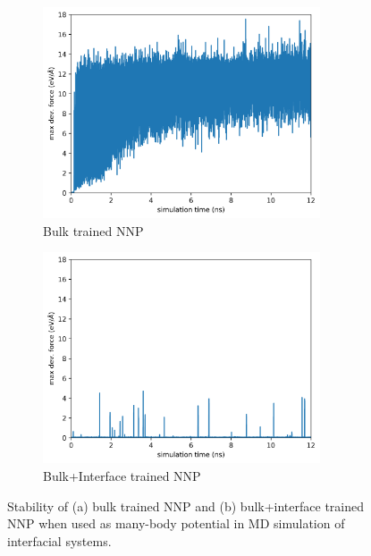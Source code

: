 \begin{figure}[tbhp]
	\centering
	\begin{subfigure}{0.48\textwidth}
		\centering

		\includegraphics[width=0.9\textwidth]{images/deviation_bulk}
		\caption{Bulk trained NNP}
		\label{fig:dev_bulk}
	\end{subfigure}
	\hfill
	\begin{subfigure}{0.48\textwidth}
		\centering

		\includegraphics[width=0.9\textwidth]{images/deviation_bulk+interface}
		\caption{Bulk+Interface trained NNP}
		\label{fig:dev_bulk_interface}
	\end{subfigure}

	\caption{Stability of (a) bulk trained NNP and (b) bulk+interface
		trained NNP when used as many-body potential in MD simulation of
		interfacial
		systems. }
	\label{fig:model_dev}
\end{figure}

